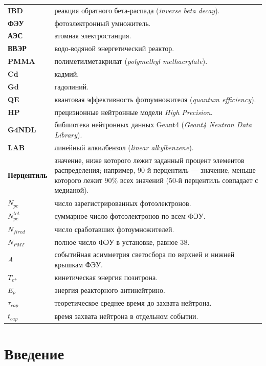 \documentclass[a4paper,12pt]{extarticle}
\begin{document}
{
\setlength{\tabcolsep}{0pt}
\renewcommand{\arraystretch}{1.15}
\noindent
\begin{tabularx}{\textwidth}{@{}>{\raggedright\arraybackslash\bfseries}p{}@{\hspace{0.75em}}>{\raggedright\arraybackslash}X@{}}
IBD & реакция обратного бета-распада (\textit{inverse beta decay}). \\
ФЭУ & фотоэлектронный умножитель. \\
АЭС & атомная электростанция. \\
ВВЭР & водо-водяной энергетический реактор. \\
PMMA & полиметилметакрилат (\textit{polymethyl methacrylate}). \\
Cd & кадмий. \\
Gd & гадолиний. \\
QE & квантовая эффективность фотоумножителя (\textit{quantum efficiency}). \\
HP & прецизионные нейтронные модели \textit{High Precision}. \\
G4NDL & библиотека нейтронных данных Geant4 (\textit{Geant4 Neutron Data Library}). \\
LAB & линейный алкилбензол (\textit{linear alkylbenzene}). \\
Перцентиль & значение, ниже которого лежит заданный процент элементов распределения; например, $90$-й перцентиль --- значение, меньше которого лежит $90\%$ всех значений ($50$-й перцентиль совпадает с медианой). \\
$N_{pe}$ & число зарегистрированных фотоэлектронов. \\
$N_{pe}^{tot}$ & суммарное число фотоэлектронов по всем ФЭУ. \\
$N_{fired}$ & число сработавших фотоумножителей. \\
$N_{PMT}$ & полное число ФЭУ в установке, равное $38$. \\
$A$ & событийная асимметрия светосбора по верхней и нижней крышкам ФЭУ. \\
$T_{e^+}$ & кинетическая энергия позитрона. \\
$E_{\bar{\nu}}$ & энергия реакторного антинейтрино. \\
$\tau_{cap}$ & теоретическое среднее время до захвата нейтрона. \\
$t_{cap}$ & время захвата нейтрона в отдельном событии. \\
\end{tabularx}
}

\newpage
{}
\section*{Введение}
\end{document}
